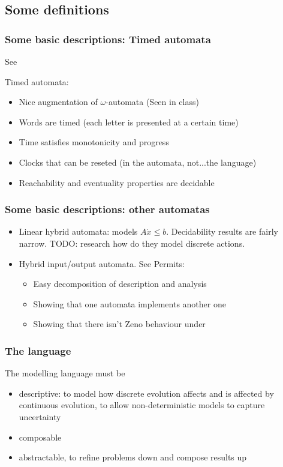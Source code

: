 \subsection{Some definitions}

\begin{frame}
	\frametitle{Some basic descriptions: Timed automata}
	See 
	
	Timed automata:
	\begin{itemize}
		\item Nice augmentation of $\omega$-automata (Seen in class)
		\item Words are timed (each letter is presented at a certain time)
		\item Time satisfies monotonicity and progress
		\item Clocks that can be reseted (in the automata, not...the language)
		\item Reachability and eventuality properties are decidable
	\end{itemize}
\end{frame}

\begin{frame}
	\frametitle{Some basic descriptions: other automatas}
	
	\begin{itemize}
		\item Linear hybrid automata: models $A\dot{x}\leq b$. Decidability results are fairly narrow. TODO: research how do they model discrete actions.
		\item Hybrid input/output automata. See
	Permits:
	\begin{itemize}
		\item Easy decomposition of description and analysis
		\item Showing that one automata implements another one
		\item Showing that there isn't Zeno behaviour under 
	\end{itemize}
		
	\end{itemize}
\end{frame}



\begin{frame}
\frametitle{The language}
	The modelling language must be
\begin{itemize}
	\item descriptive: to model how discrete evolution affects and is affected by continuous evolution, to allow non-deterministic models to capture uncertainty
	\item composable
	\item abstractable, to refine problems down and compose results up
\end{itemize}

\end{frame}

